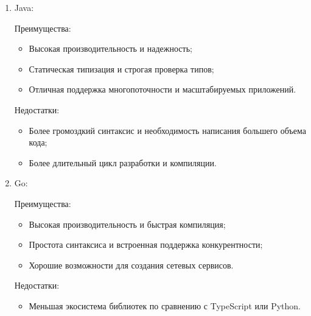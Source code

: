 \documentclass[utf8, russian]{eskdtext}
\begin{document}
\begin{enumerate}
    Преимущества:
        \begin{itemize}
            \item Простота и читаемость кода;
            \item Богатая стандартная библиотека и поддержка веб-фреймворков;
            \item Отличная поддержка для работы с API и сетевыми запросами.
        \end{itemize}
     
        Недостатки:
        \begin{itemize}
            \item Меньшая производительность по сравнению с компилируемыми языками;
            \item Проблемы с параллелизмом из-за GIL (Global Interpreter Lock).
        \end{itemize}

    
    \item {Java:}

         Преимущества:
        \begin{itemize}
            \item Высокая производительность и надежность;
            \item Статическая типизация и строгая проверка типов;
            \item Отличная поддержка многопоточности и масштабируемых приложений.
        \end{itemize}

         Недостатки:
        \begin{itemize}
            \item Более громоздкий синтаксис и необходимость написания большего объема кода;
            \item Более длительный цикл разработки и компиляции.
        \end{itemize}

    
    \item {Go:}

         Преимущества:
        \begin{itemize}
            \item Высокая производительность и быстрая компиляция;
            \item Простота синтаксиса и встроенная поддержка конкурентности;
            \item Хорошие возможности для создания сетевых сервисов.
        \end{itemize}

         Недостатки:
        \begin{itemize}
            \item Меньшая экосистема библиотек по сравнению с TypeScript или Python.
        \end{itemize}

\end{enumerate}
\end{document}
